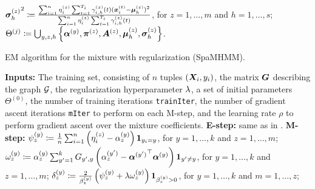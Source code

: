 \begin{algorithm}
\begin{algorithmic}[1]
        \vspace{0.3cm}
        \State ${{\bm{\sigma}}^{(z)}_h}^2 \coloneqq \frac{\sum_{i=1}^n \eta^{(z)}_{i} \sum_{t=1}^{T_i} \gamma^{(z)}_{i,h}(t) ({\bm{x}}_i^{(t)} - {\bm{\mu}}^{(z)}_h)^2} {\sum_{i=1}^n \eta^{(z)}_{i} \sum_{t=1}^{T_i} \gamma^{(z)}_{i,h}(t)}$, for $z=1,\dots,m$ and $h=1,\dots,s$;
        \vspace{0.3cm}
        \State $\Theta^{(j)} \coloneqq \bigcup_{y,z,h} \left\lbrace {\bm{\alpha}}^{(y)}, {\bm{\pi}}^{(z)}, {\bm{A}}^{(z)}, {\bm{\mu}}^{(z)}_h, {\bm{\sigma}}^{(z)}_h \right\rbrace$.
        \vspace{0.3cm}
        \EndIndent
        \EndFor
    \end{algorithmic}
\end{algorithm}

\begin{algorithm}
    \caption{EM algorithm for the mixture with regularization (SpaMHMM).}
    \label{alg:spamhmm}
    \begin{algorithmic}[1]
        \State \textbf{Inputs:} The training set, consisting of $n$ tuples $({\bm{X}}_i,y_i)$, the matrix ${\bm{G}}$ describing the graph ${\mathcal{G}}$, the regularization hyperparameter $\lambda$, a set of initial parameters $\Theta^{(0)}$, the number of training iterations \texttt{trainIter}, the number of gradient ascent iterations \texttt{mIter} to perform on each M-step, and the learning rate $\rho$ to perform gradient ascent over the mixture coefficients.
        \vspace{0.3cm}
        \vspace{0.3cm}
        \State \textbf{E-step:} same as in .
        \vspace{0.3cm}
        \State \textbf{M-step:}
        \vspace{0.3cm}
        \Indent
        \vspace{0.3cm}
        \State $\psi^{(y)}_{z} \coloneqq \frac{1}{n}\sum_{i=1}^n \left(\eta^{(z)}_i - {\alpha}^{(y)}_{z}\right) \bm{1}_{y_i=y}$, for $y=1,\dots,k$ and $z=1,\dots,m$;
        \vspace{0.3cm}
        \State $\omega^{(y)}_{z} \coloneqq {\alpha}^{(y)}_{z} \sum_{y'=1}^k {G}_{y',y}\left({\alpha}^{(y')}_{z} - {{\bm{\alpha}}^{(y')}} ^\top {\bm{\alpha}}^{(y)} \right) \bm{1}_{y' \neq y}$, for $y=1,\dots,k$ and $z=1,\dots,m$;
        \vspace{0.3cm}
        \State $\delta^{(y)}_z \coloneqq \frac{2}{{\beta}^{(y)}_{z}}\left(\psi^{(y)}_{z} + \lambda \omega^{(y)}_{z}\right) \bm{1}_{{\beta}^{(y)}_{z} > 0}$, for $y=1,\dots,k$ and $m=1,\dots,z$;

\end{algorithmic}
\end{algorithm}
